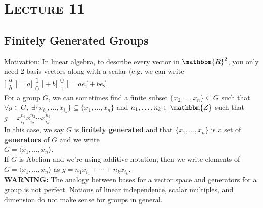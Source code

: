 \documentclass{article}
\newcommand{\Z}{\mathbbm{Z}}
\newcommand{\R}{\mathbbm{R}}
\newcommand{\define}[1]{\textbf{\underline{#1}}}
\theoremstyle{definition}
\theoremstyle{remark}
\begin{document}
    \section*{\textbf{\textsc{Lecture 11}}}{
        \subsection*{Finitely Generated Groups}{
            Motivation: In linear algebra, to describe every vector in $\R^2$, you only need 2 basis vectors along with a scalar (e.g. we can write $\big[\begin{smallmatrix}a\\b\end{smallmatrix}\big]= a\big[\begin{smallmatrix}1\\0\end{smallmatrix}\big]+b\big[\begin{smallmatrix}0\\1\end{smallmatrix}\big]=a\Vec{e_1}+b\Vec{e_2}$.\\
            
            \noindent For a group $G$, we can sometimes find a finite subset $\{x_2,\ldots,x_n\}\subseteq G$ such that $\forall g \in G, \; \exists \{x_{i_1},\ldots, x_{i_k}\} \subseteq \{x_1,\ldots,x_n\}$ and $n_1,\ldots,n_k \in \Z$ such that $g=x_{i_1}^{n_1}x_{i_2}^{n_2}\cdots x_{i_k}^{n_k}$.\\
            In this case, we say $G$ is \define{finitely generated} and that $\{x_1,\ldots,x_n\}$ is a set of \define{generators} of $G$ and we write\\$G=\langle x_1,\ldots,x_n\rangle$.\\
            
            \noindent If $G$ is Abelian and we're using additive notation, then we write elements of $G=\langle x_1,\ldots,x_n\rangle$ as $g=n_1x_{i_1}+\cdots+n_kx_{i_k}$.\\
            
            \noindent\define{WARNING:} The analogy between bases for a vector space and generators for a group is not perfect. Notions of linear independence, scalar multiples, and dimension do not make sense for groups in general.
        }
}
\end{document}
